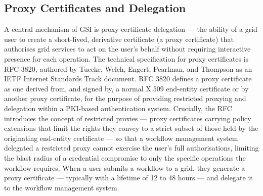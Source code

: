 \documentclass[12pt,a4paper]{report}
\begin{document}
\subsection*{Proxy Certificates and Delegation}
A central mechanism of GSI is proxy certificate delegation — the ability of a grid user to create a short-lived, derivative certificate 
(a proxy certificate) that authorises grid services to act on the user’s behalf without requiring interactive presence for each operation. 
The technical specification for proxy certificates is RFC 3820, authored by Tuecke, Welch, Engert, Pearlman, and Thompson \parencite{rfc3820} as an IETF
 Internet Standards Track document. RFC 3820 defines a proxy certificate as one derived from, and signed by, a normal X.509 end-entity 
 certificate or by another proxy certificate, for the purpose of providing restricted proxying and delegation within a PKI-based authentication
  system. Crucially, the RFC introduces the concept of restricted proxies — proxy certificates carrying policy extensions that limit the rights
   they convey to a strict subset of those held by the originating end-entity certificate — so that a workflow management system delegated a 
   restricted proxy cannot exercise the user’s full authorisations, limiting the blast radius of a credential compromise to only the specific
    operations the workflow requires. When a user submits a workflow to a grid, they generate a proxy certificate — typically with a lifetime 
    of 12 to 48 hours — and delegate it to the workflow management system. 
    
\end{document}
